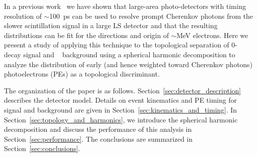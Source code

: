  In a previous work~\cite{Aberle2014} we have shown that large-area
photo-detectors with timing resolution of $\sim$100~ps can be used to
resolve prompt Cherenkov photons from the slower scintillation signal
in a large LS detector and that the resulting distributions can be fit for
the directions and origin of $\sim$MeV electrons. Here we present a
study of applying this technique to the topological separation of
0\nbb-decay signal and \B~ background using a spherical harmonic
decomposition to analyze the distribution of early (and hence weighted
toward Cherenkov photons) photoelectrons (PEs) as a topological
discriminant.

The organization of the paper is as follows. 
Section~\ref{sec:detector_description} describes
the detector model. Details on event
kinematics and PE timing for signal and background are given in
Section~\ref{sec:kinematics_and_timing}. In
Section~\ref{sec:topology_and_harmonics}, we introduce the spherical
harmonic decomposition and discuss the performance of this analysis
in Section~\ref{sec:performance}. The conclusions are summarized in Section~\ref{sec:conclusions}.




  
